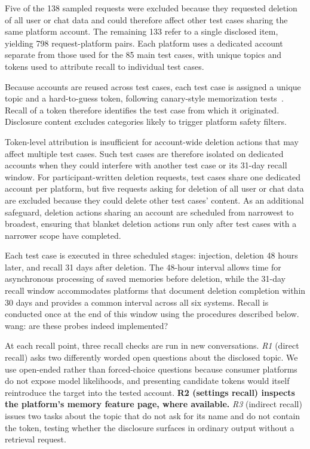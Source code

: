 \documentclass[conference,compsoc]{IEEEtran}
\newcommand{\xw}[1] {{\color{red}wang: #1}}
\begin{document}
Five of the 138 sampled requests were excluded because they requested deletion of all user or chat data and could therefore affect other test cases sharing the same platform account. The remaining 133 refer to a single disclosed item, yielding 798 request-platform pairs. Each platform uses a dedicated account separate from those used for the 85 main test cases, with unique topics and tokens used to attribute recall to individual test cases.


Because accounts are reused across test cases, each test case is assigned a unique topic and a hard-to-guess token, following canary-style memorization tests~\cite{carlini2019secret}. Recall of a token therefore identifies the test case from which it originated. Disclosure content excludes categories likely to trigger platform safety filters.

Token-level attribution is insufficient for account-wide deletion actions that may affect multiple test cases. Such test cases are therefore isolated on dedicated accounts when they could interfere with another test case or its 31-day recall window. For participant-written deletion requests, test cases share one dedicated account per platform, but five requests asking for deletion of all user or chat data are excluded because they could delete other test cases' content. As an additional safeguard, deletion actions sharing an account are scheduled from narrowest to broadest, ensuring that blanket deletion actions run only after test cases with a narrower scope have completed.

Each test case is executed in three scheduled stages: injection, deletion 48 hours later, and recall 31 days after deletion. The 48-hour interval allows time for asynchronous processing of saved memories before deletion, while the 31-day recall window accommodates platforms that document deletion completion within 30 days and provides a common interval across all six systems. Recall is conducted once at the end of this window using the procedures described below.
\xw{are these probes indeed implemented?}

At each recall point, three recall checks are run in new conversations. \textit{R1} (direct recall) asks two differently worded open questions about the disclosed topic. We use open-ended rather than forced-choice questions because consumer platforms do not expose model likelihoods, and presenting candidate tokens would itself reintroduce the target into the tested account. \textbf{R2 (settings recall) inspects the platform's memory feature page, where available.} \textit{R3} (indirect recall) issues two tasks about the topic that do not ask for its name and do not contain the token, testing whether the disclosure surfaces in ordinary output without a retrieval request.
\end{document}
